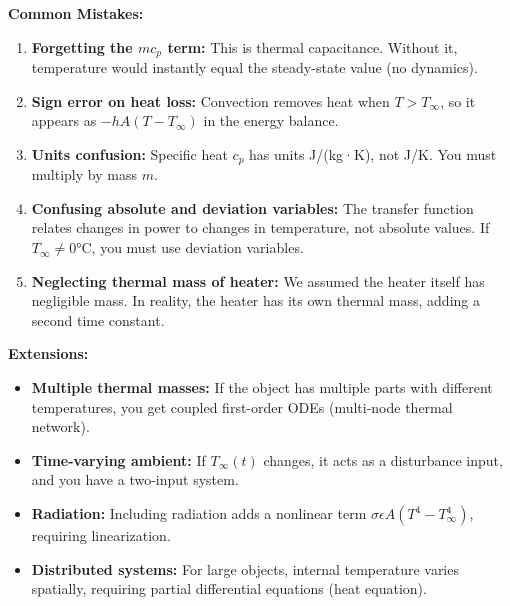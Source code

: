 \begin{example}
\textbf{Common Mistakes:}

\begin{enumerate}
    \item \textbf{Forgetting the $mc_p$ term:} This is thermal capacitance. Without it, temperature would instantly equal the steady-state value (no dynamics).

    \item \textbf{Sign error on heat loss:} Convection removes heat when $T > T_\infty$, so it appears as $-hA(T - T_\infty)$ in the energy balance.

    \item \textbf{Units confusion:} Specific heat $c_p$ has units J/(kg·K), not J/K. You must multiply by mass $m$.

    \item \textbf{Confusing absolute and deviation variables:} The transfer function relates changes in power to changes in temperature, not absolute values. If $T_\infty \neq 0°$C, you must use deviation variables.

    \item \textbf{Neglecting thermal mass of heater:} We assumed the heater itself has negligible mass. In reality, the heater has its own thermal mass, adding a second time constant.
\end{enumerate}

\textbf{Extensions:}

\begin{itemize}
    \item \textbf{Multiple thermal masses:} If the object has multiple parts with different temperatures, you get coupled first-order ODEs (multi-node thermal network).

    \item \textbf{Time-varying ambient:} If $T_\infty(t)$ changes, it acts as a disturbance input, and you have a two-input system.

    \item \textbf{Radiation:} Including radiation adds a nonlinear term $\sigma \epsilon A (T^4 - T_\infty^4)$, requiring linearization.

    \item \textbf{Distributed systems:} For large objects, internal temperature varies spatially, requiring partial differential equations (heat equation).
\end{itemize}

\end{example}

